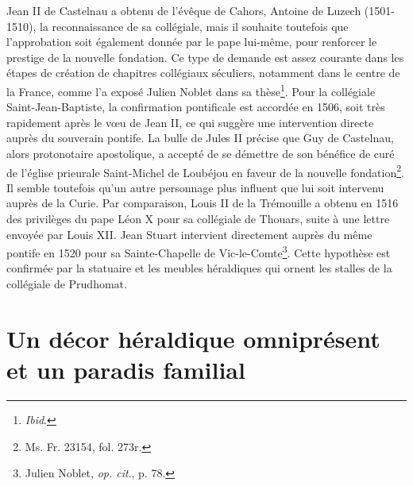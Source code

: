 \documentclass[12pt,twoside,openany]{book}
\begin{document}
Jean II de Castelnau a obtenu de l’évêque de Cahors, Antoine de Luzech (1501-1510), la reconnaissance de sa collégiale, mais il souhaite toutefois que l’approbation soit également donnée par le pape lui-même, pour renforcer le prestige de la nouvelle fondation. Ce type de demande est assez courante dans les étapes de création de chapitres collégiaux séculiers, notamment dans le centre de la France, comme l’a exposé Julien Noblet dans sa thèse\footnote{\textit{Ibid}.}. Pour la collégiale Saint-Jean-Baptiste, la confirmation pontificale est accordée en 1506, soit très rapidement après le vœu de Jean II, ce qui suggère une intervention directe auprès du souverain pontife. La bulle de Jules II précise que Guy de Castelnau, alors protonotaire apostolique, a accepté de se démettre de son bénéfice de curé de l’église prieurale Saint-Michel de Loubéjou en faveur de la nouvelle fondation\footnote{Ms. Fr. 23154, fol. 273r.}. Il semble toutefois qu’un autre personnage plus influent que lui soit intervenu auprès de la Curie. Par comparaison, Louis II de la Trémouille a obtenu en 1516 des privilèges du pape Léon X pour sa collégiale de Thouars, suite à une lettre envoyée par Louis XII. Jean Stuart intervient directement auprès du même pontife en 1520 pour sa Sainte-Chapelle de Vic-le-Comte\footnote{Julien Noblet, \textit{op. cit}., p. 78.}. Cette hypothèse est confirmée par la statuaire et les meubles héraldiques qui ornent les stalles de la collégiale de Prudhomat.

\section{Un décor héraldique omniprésent et un paradis familial}
\end{document}
